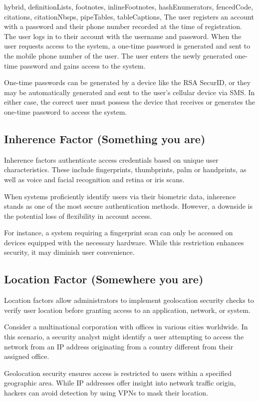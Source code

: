\documentclass[
  digital,     %
  oneside,     %
  nosansbold,  %
  nocolorbold, %
  lof,         %
  lot,         %
]{fithesis4}
\begin{document}
\begin{markdown*}{%
  hybrid,
  definitionLists,
  footnotes,
  inlineFootnotes,
  hashEnumerators,
  fencedCode,
  citations,
  citationNbsps,
  pipeTables,
  tableCaptions,
}
The user registers an account with a password and their phone number recorded at the time of registration.
The user logs in to their account with the username and password.
When the user requests access to the system, a one-time password is generated and sent to the mobile phone number of the user.
The user enters the newly generated one-time password and gains access to the system.

One-time passwords can be generated by a device like the RSA SecurID, or they may be automatically generated and sent to the user's cellular device via SMS.
In either case, the correct user must possess the device that receives or generates the one-time password to access the system.


\newpage
\subsection{Inherence Factor (Something you are)}
Inherence factors authenticate access credentials based on unique user characteristics.
These include fingerprints, thumbprints, palm or handprints, as well as voice and facial recognition and retina or iris scans.

When systems proficiently identify users via their biometric data, inherence stands as one of the most secure authentication methods.
However, a downside is the potential loss of flexibility in account access.

For instance, a system requiring a fingerprint scan can only be accessed on devices equipped with the necessary hardware.
While this restriction enhances security, it may diminish user convenience. \cite{auth-factors-rublon}

\subsection{Location Factor (Somewhere you are)}
Location factors allow administrators to implement geolocation security checks to verify user location before granting access to an application, network, or system.

Consider a multinational corporation with offices in various cities worldwide.
In this scenario, a security analyst might identify a user attempting to access the network from an IP address originating from a country different from their assigned office.

Geolocation security ensures access is restricted to users within a specified geographic area.
While IP addresses offer insight into network traffic origin, hackers can avoid detection by using VPNs to mask their location.


\end{markdown*}
\end{document}
